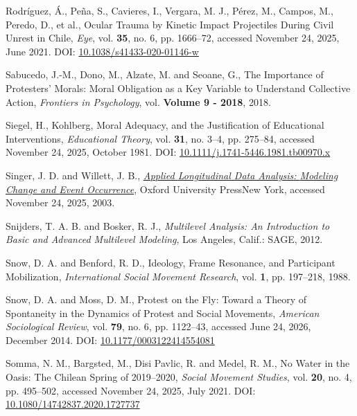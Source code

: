 \documentclass[
  13pt,
]{article}
\newlength{\cslhangindent}
\newenvironment{CSLReferences}[2] %
 {\begin{list}{}{%
  \setlength{\itemindent}{0pt}
  \setlength{\leftmargin}{0pt}
  \setlength{\parsep}{0pt}
  \ifodd #1
   \setlength{\leftmargin}{\cslhangindent}
   \setlength{\itemindent}{-1\cslhangindent}
  \fi
  \setlength{\itemsep}{#2\baselineskip}}}
 {\end{list}}
\begin{document}
\begin{CSLReferences}{1}{0}
Rodríguez, Á., Peña, S., Cavieres, I., Vergara, M. J., Pérez, M.,
Campos, M., Peredo, D., et al., Ocular Trauma by Kinetic Impact
Projectiles During Civil Unrest in {Chile}, \emph{Eye}, vol.
\textbf{35}, no. 6, pp. 1666--72, accessed November 24, 2025, June 2021.
DOI:
\href{https://doi.org/10.1038/s41433-020-01146-w}{10.1038/s41433-020-01146-w}

Sabucedo, J.-M., Dono, M., Alzate, M. and Seoane, G., The {Importance}
of {Protesters}' {Morals}: {Moral Obligation} as a {Key Variable} to
{Understand Collective Action}, \emph{Frontiers in Psychology}, vol.
\textbf{Volume 9 - 2018}, 2018.

Siegel, H., Kohlberg, {Moral Adequacy}, and the {Justification} of
{Educational Interventions}, \emph{Educational Theory}, vol.
\textbf{31}, no. 3--4, pp. 275--84, accessed November 24, 2025, October
1981. DOI:
\href{https://doi.org/10.1111/j.1741-5446.1981.tb00970.x}{10.1111/j.1741-5446.1981.tb00970.x}

Singer, J. D. and Willett, J. B.,
\emph{\href{https://doi.org/10.1093/acprof:oso/9780195152968.001.0001}{Applied
{Longitudinal Data Analysis}: {Modeling Change} and {Event
Occurrence}}}, Oxford University PressNew York, accessed November 24,
2025, 2003.

Snijders, T. A. B. and Bosker, R. J., \emph{Multilevel Analysis: An
Introduction to Basic and Advanced Multilevel Modeling}, Los Angeles,
Calif.: SAGE, 2012.

Snow, D. A. and Benford, R. D., Ideology, {Frame Resonance}, and
{Participant Mobilization}, \emph{International Social Movement
Research}, vol. \textbf{1}, pp. 197--218, 1988.

Snow, D. A. and Moss, D. M., Protest on the {Fly}: {Toward} a {Theory}
of {Spontaneity} in the {Dynamics} of {Protest} and {Social Movements},
\emph{American Sociological Review}, vol. \textbf{79}, no. 6, pp.
1122--43, accessed June 24, 2026, December 2014. DOI:
\href{https://doi.org/10.1177/0003122414554081}{10.1177/0003122414554081}

Somma, N. M., Bargsted, M., Disi Pavlic, R. and Medel, R. M., No Water
in the Oasis: The {Chilean Spring} of 2019--2020, \emph{Social Movement
Studies}, vol. \textbf{20}, no. 4, pp. 495--502, accessed November 24,
2025, July 2021. DOI:
\href{https://doi.org/10.1080/14742837.2020.1727737}{10.1080/14742837.2020.1727737}


\end{CSLReferences}
\end{document}

